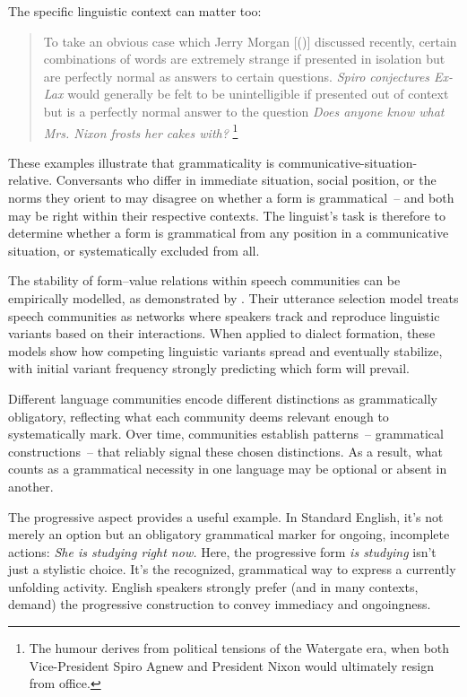\documentclass[12pt,letterpaper]{article}
\begin{document}
The specific linguistic context can matter too:
\begin{quote}
To take an obvious case which Jerry Morgan [(\citeyear{morgan1973})] discussed recently, certain combinations of words are extremely strange if presented in isolation but are perfectly normal as answers to certain questions. \textit{Spiro conjectures Ex-Lax} would generally be felt to be unintelligible if presented out of context but is a perfectly normal answer to the question \textit{Does anyone know what Mrs. Nixon frosts her cakes with?} \autocite[252, italics added]{McCawley1974}\footnote{The humour derives from political tensions of the Watergate era, when both Vice-President Spiro Agnew and President Nixon would ultimately resign from office.}
\end{quote}

These examples illustrate that grammaticality is communicative-situation-relative. Conversants who differ in immediate situation, social position, or the norms they orient to may disagree on whether a form is grammatical~-- and both may be right within their respective contexts. The linguist's task is therefore to determine whether a form is grammatical from any position in a communicative situation, or systematically excluded from all.

The stability of form--value relations within speech communities can be empirically modelled, as demonstrated by \textcite{blythe2009speech}. Their utterance selection model treats speech communities as networks where speakers track and reproduce linguistic variants based on their interactions. When applied to dialect formation, these models show how competing linguistic variants spread and eventually stabilize, with initial variant frequency strongly predicting which form will prevail.

Different language communities encode different distinctions as grammatically obligatory, reflecting what each community deems relevant enough to systematically mark. Over time, communities establish patterns~--  grammatical constructions~--  that reliably signal these chosen distinctions. As a result, what counts as a grammatical necessity in one language may be optional or absent in another.

The progressive aspect provides a useful example. In Standard English, it's not merely an option but an obligatory grammatical marker for ongoing, incomplete actions:
\ea
\textit{She is studying right now.}
\z
Here, the progressive form \textit{is studying} isn't just a stylistic choice. It's the recognized, grammatical way to express a currently unfolding activity. English speakers strongly prefer (and in many contexts, demand) the progressive construction to convey immediacy and ongoingness.
\end{document}
